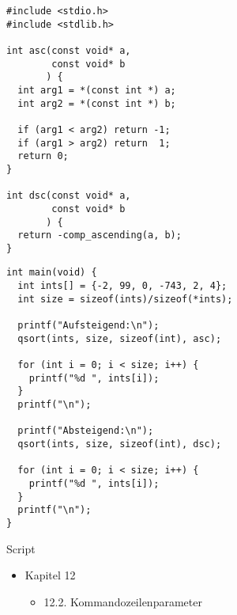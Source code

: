\begin{frame}[fragile]
%
%
\begin{codebox}[Beispiel: \texttt{qsort}, equal height group=Gqsort]
\begin{verbatim}
#include <stdio.h>
#include <stdlib.h>
 
int asc(const void* a, 
        const void* b
       ) {
  int arg1 = *(const int *) a;
  int arg2 = *(const int *) b;
 
  if (arg1 < arg2) return -1;
  if (arg1 > arg2) return  1;
  return 0;
}

int dsc(const void* a, 
        const void* b
       ) {
  return -comp_ascending(a, b);
}
\end{verbatim}
\end{codebox}
%
\begin{codebox}[...Fortsetzung, equal height group=Gqsort]
\begin{verbatim}
int main(void) {
  int ints[] = {-2, 99, 0, -743, 2, 4};
  int size = sizeof(ints)/sizeof(*ints);
    
  printf("Aufsteigend:\n");
  qsort(ints, size, sizeof(int), asc);
    
  for (int i = 0; i < size; i++) {
    printf("%d ", ints[i]);
  }
  printf("\n");
    
  printf("Absteigend:\n");
  qsort(ints, size, sizeof(int), dsc);
    
  for (int i = 0; i < size; i++) {
    printf("%d ", ints[i]);
  }
  printf("\n");
}
\end{verbatim}
\end{codebox}
%
\end{frame}


\begin{frame}{Script}
%
\begin{itemize}
\item Kapitel 12
	\begin{itemize}
	\item 12.2. Kommandozeilenparameter
	\end{itemize}
\end{itemize}
%
\end{frame}


